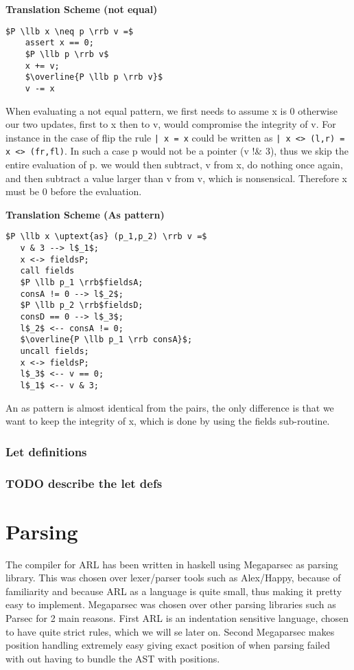 \documentclass[a4paper]{article}
\begin{document}
\begin{minipage}[t]{0.6\textwidth}
\textbf{Translation Scheme (not equal)}
\begin{lstlisting}
$P \llb x \neq p \rrb v =$
    assert x == 0;
    $P \llb p \rrb v$
    x += v;
    $\overline{P \llb p \rrb v}$
    v -= x
\end{lstlisting}
When evaluating a not equal pattern, we first needs to assume x is 0 otherwise our two updates, first to x then to v, would compromise the integrity of v. For instance in the case of flip the rule \texttt{| x = x} could be written as \texttt{| x <> (l,r) = x <> (fr,fl)}. In such a case p would not be a pointer (v !\& 3), thus we skip the entire evaluation of p. we would then subtract, v from x, do nothing once again, and then subtract a value larger than v from v, which is nonsensical. Therefore x must be 0 before the evaluation.
\end{minipage}


\begin{minipage}[t]{0.6\textwidth}
\textbf{Translation Scheme (As pattern)}
\begin{lstlisting}
$P \llb x \uptext{as} (p_1,p_2) \rrb v =$
   v & 3 --> l$_1$;
   x <-> fieldsP;
   call fields
   $P \llb p_1 \rrb$fieldsA;
   consA != 0 --> l$_2$;
   $P \llb p_2 \rrb$fieldsD;
   consD == 0 --> l$_3$;
   l$_2$ <-- consA != 0;
   $\overline{P \llb p_1 \rrb consA}$;
   uncall fields;
   x <-> fieldsP;
   l$_3$ <-- v == 0;
   l$_1$ <-- v & 3;
\end{lstlisting}
An as pattern is almost identical from the pairs, the only difference is that we want to keep the integrity of x, which is done by using the fields sub-routine.
\end{minipage}
\subsubsection{Let definitions}
\label{sec:orgf8aa22e}
\subsubsection{{\bfseries\sffamily TODO} describe the let defs}
\label{sec:org16507a5}
\section{Parsing}
\label{sec:org1bb46c8}
The compiler for ARL has been written in haskell using Megaparsec as parsing library. This was chosen over lexer/parser tools such as Alex/Happy, because of familiarity and because ARL as a language is quite small, thus making it pretty easy to implement. Megaparsec was chosen over other parsing libraries such as Parsec for 2 main reasons. First ARL is an indentation sensitive language, chosen to have quite strict rules, which we will se later on. Second Megaparsec makes position handling extremely easy giving exact position of when parsing failed with out having to bundle the AST with positions.
\end{document}
